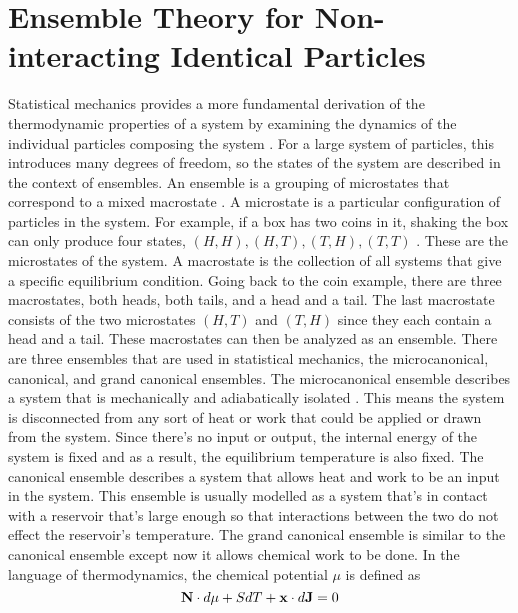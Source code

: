 \section{Ensemble Theory for Non-interacting Identical Particles}
Statistical mechanics provides a more fundamental derivation of the thermodynamic properties of a system by examining the dynamics of the individual particles composing the system \cite{Kardar}. For a large system of particles, this introduces many degrees of freedom, so the states of the system are described in the context of ensembles. An ensemble is a grouping of microstates that correspond to a mixed macrostate \cite{Kardar}. A microstate is a particular configuration of particles in the system. For example, if a box has two coins in it, shaking the box can only produce four states, $(H,H),(H,T),(T,H),(T,T)$ \cite{Blundell}. These are the microstates of the system. A macrostate is the collection of all systems that give a specific equilibrium condition. Going back to the coin example, there are three macrostates, both heads, both tails, and a head and a tail. The last macrostate consists of the two microstates $(H,T)$ and $(T,H)$ since they each contain a head and a tail. These macrostates can then be analyzed as an ensemble. There are three ensembles that are used in statistical mechanics, the microcanonical, canonical, and grand canonical ensembles. The microcanonical ensemble describes a system that is mechanically and adiabatically isolated \cite{Kardar}. This means the system is disconnected from any sort of heat or work that could be applied or drawn from the system. Since there's no input or output, the internal energy of the system is fixed and as a result, the equilibrium temperature is also fixed. 
The canonical ensemble describes a system that allows heat and work to be an input in the system. This ensemble is usually modelled as a system that's in contact with a reservoir that's large enough so that interactions between the two do not effect the reservoir's temperature. 
The grand canonical ensemble is similar to the canonical ensemble except now it allows chemical work to be done. In the language of thermodynamics, the chemical potential $\mu$ is defined as 
\begin{equation*}
    \bold{N}\cdot d\mu+S dT+\bold{x}\cdot d\bold{J}=0
\end{equation*}
